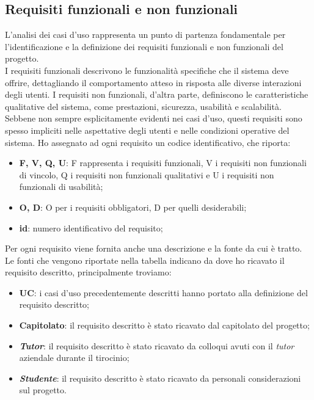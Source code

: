 \subsection{Requisiti funzionali e non funzionali}
L'analisi dei casi d'uso rappresenta un punto di partenza fondamentale per l'identificazione e la definizione dei requisiti 
funzionali e non funzionali del progetto.\\
I requisiti funzionali descrivono le funzionalità specifiche che il sistema deve offrire, dettagliando il comportamento atteso 
in risposta alle diverse interazioni degli utenti. 
I requisiti non funzionali, d'altra parte, definiscono le caratteristiche qualitative del sistema, come prestazioni, 
sicurezza, usabilità e scalabilità. Sebbene non sempre esplicitamente evidenti nei casi d'uso, questi requisiti 
sono spesso impliciti nelle aspettative degli utenti e nelle condizioni operative del sistema.
Ho assegnato ad ogni requisito un codice identificativo, che riporta:
\begin{itemize}
    \item \textbf{F, V, Q, U}: F rappresenta i requisiti funzionali, V i requisiti non funzionali di vincolo, Q i 
          requisiti non funzionali qualitativi e U i 
          requisiti non funzionali di usabilità;
    \item \textbf{O, D}: O per i requisiti obbligatori, D per quelli desiderabili;
    \item \textbf{id}: numero identificativo del requisito;
\end{itemize}
Per ogni requisito viene fornita anche una descrizione e la fonte da cui è tratto.
Le fonti che vengono riportate nella tabella indicano da dove ho ricavato il requisito descritto, principalmente 
troviamo:
\begin{itemize}
    \item \textbf{UC}: i casi d'uso precedentemente descritti hanno portato alla definizione del requisito descritto;
    \item \textbf{Capitolato}: il requisito descritto è stato ricavato dal capitolato del progetto;
    \item \textbf{\textit{Tutor}}: il requisito descritto è stato ricavato da colloqui avuti con il \textit{tutor} aziendale 
          durante il tirocinio;
    \item \textbf{\textit{Studente}}: il requisito descritto è stato ricavato da personali considerazioni sul progetto.
\end{itemize}


